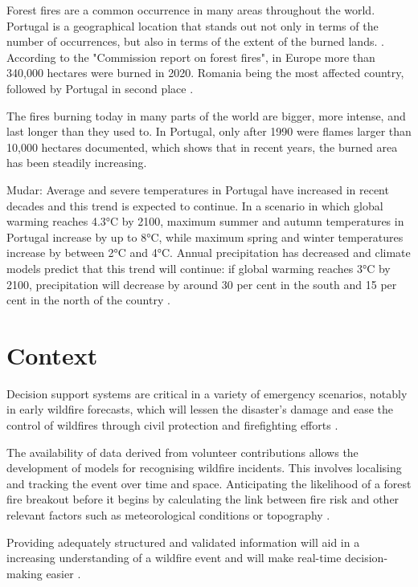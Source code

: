 Forest fires are a common occurrence in many areas throughout the world. Portugal is a geographical location that stands out not only in terms of the number of occurrences, but also in terms of the extent of the burned lands. \cite{silva2012}.
According to the "Commission report on forest fires", in Europe more than 340,000 hectares were burned in 2020. Romania being the most affected country, followed by Portugal in second place \cite{ec2021forestfires}.




The fires burning today in many parts of the world are bigger, more intense, and last longer than they used to. In Portugal, only after 1990 were flames larger than 10,000 hectares documented, which shows that in recent years, the burned area has been steadily increasing\cite{viegas2018wildfires}.


Mudar:
Average and severe temperatures in Portugal have increased in recent decades and this trend is expected to continue. In a scenario in which global warming reaches 4.3°C by 2100, maximum summer and autumn temperatures in Portugal increase by up to 8°C, while maximum spring and winter temperatures increase by between 2°C and 4°C. Annual precipitation has decreased and climate models predict that this trend will continue: if global warming reaches 3°C by 2100, precipitation will decrease by around 30 per cent in the south and 15 per cent in the north of the country \cite{schleussner2020climate}.




\section{Context}
\label{subsec:sec1}

Decision support systems are critical in a variety of emergency scenarios, notably in early wildfire forecasts, which will lessen the disaster's damage and ease the control of wildfires through civil protection and firefighting efforts \cite{DEI2023}.


The availability of data derived from volunteer contributions allows the development of models for recognising wildfire incidents.
This involves localising and tracking the event over time and space. Anticipating the likelihood of a forest fire breakout before it begins by calculating the link between fire risk and other relevant factors such as meteorological conditions or topography \cite{DEI2023}. 


Providing adequately structured and validated information will aid in a increasing understanding of a wildfire event and will make real-time decision-making easier \cite{Abid2021, DEI2023}.

